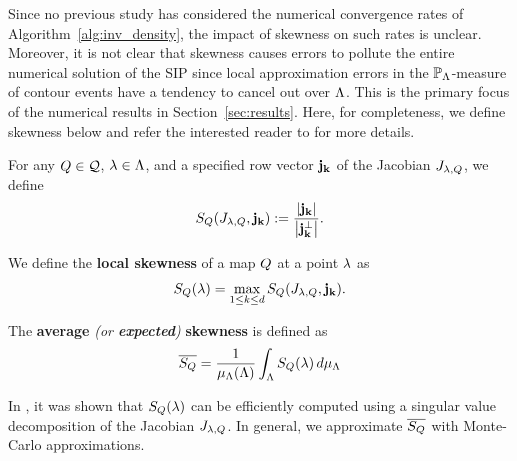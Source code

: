 Since no previous study has considered the numerical convergence rates of Algorithm~\ref{alg:inv_density}, the impact of skewness on such rates is unclear.
Moreover, it is not clear that skewness causes errors to pollute the entire numerical solution of the SIP since local approximation errors in the $\mathbb{P}_{\Lambda}$-measure of contour events have a tendency to cancel out over ${\Lambda}$. 
This is the primary focus of the numerical results in Section~\ref{sec:results}. 
Here, for completeness, we define skewness below and refer the interested reader to \cite{BGE+15, BPW17} for more details.


\begin{defn}
For any $Q\in\mathcal{Q}$, $\lambda \in {\Lambda}$, and a specified row vector $\bf{j}_k$ of the Jacobian $J_{\lambda, Q}$, we define
\begin{equation}
S_Q(J_{\lambda,Q}, \bf{j}_k) := \frac{\left\vert\bf{j}_k\right\vert }{\left\vert\bf{j}_k^\perp\right\vert}.
\label{eq:skewness}
\end{equation}

We define the \textbf{local skewness} of a map $Q$ at a point $\lambda$ as 
\begin{equation}
S_Q(\lambda) = \max_{1\leq k \leq d} S_Q(J_{\lambda,Q}, \bf{j}_k).
\label{eq:localskewness}
\end{equation}
\end{defn}

\begin{defn}
The \textbf{average} \emph{(or \textbf{expected})} \textbf{skewness} is defined as
\begin{equation}
\overline{S_Q} = \frac{1}{\mu_{{\Lambda}}({\Lambda})} \int_{\Lambda} S_Q (\lambda) \, d\mu_{{\Lambda}}
\label{eq:avgskew}
\end{equation}
\end{defn}

In \cite{BPW17}, it was shown that $S_Q(\lambda)$ can be efficiently computed using a singular value decomposition of the Jacobian $J_{\lambda,Q}$. 
In general, we approximate $\overline{S_Q}$ with Monte-Carlo approximations.



